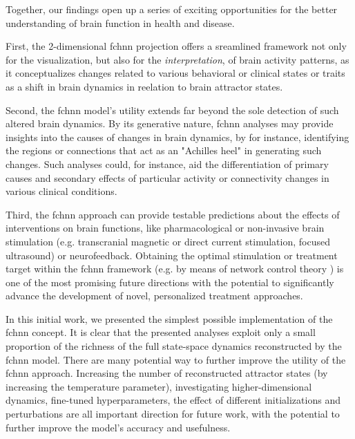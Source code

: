 \documentclass{article}
\begin{document}
Together, our findings open up a series of exciting opportunities for the better understanding of brain function in health and disease.

First, the 2-dimensional \acrshort{fchnn} projection offers a sreamlined framework not only for the visualization, but also for the \textit{interpretation}, of brain activity patterns, as it conceptualizes changes related to various behavioral or clinical states or traits as a shift in brain dynamics in reelation to brain attractor states.

Second, the \acrshort{fchnn} model's utility extends far beyond the sole detection of such altered brain dynamics. By its generative nature, \acrshort{fchnn} analyses may provide insights into the causes of changes in brain dynamics, by for instance, identifying the regions or connections that act as an "Achilles heel" in generating such changes. Such analyses could, for instance, aid the differentiation of primary causes and secondary effects of particular activity or connectivity changes in various clinical conditions.

Third, the \acrshort{fchnn} approach can provide testable predictions about the effects of interventions on brain functions, like pharmacological or non-invasive brain stimulation (e.g. transcranial magnetic or direct current stimulation, focused ultrasound) or neurofeedback. Obtaining the optimal stimulation or treatment target within the \acrshort{fchnn} framework (e.g. by means of network control theory \citep{liu2011controllability}) is one of the most promising future directions with the potential to significantly advance the development of novel, personalized treatment approaches.

In this initial work, we presented the simplest possible implementation of the \acrshort{fchnn} concept. It is clear that the presented analyses exploit only a small proportion of the richness of the full state-space dynamics reconstructed by the \acrshort{fchnn} model.
There are many potential way to further improve the utility of the \acrshort{fchnn} approach. Increasing the number of reconstructed attractor states (by increasing the temperature parameter), investigating higher-dimensional dynamics, fine-tuned hyperparameters, the effect of
different initializations and perturbations are all important direction for future work, with the potential to further improve the model's accuracy and usefulness.
\end{document}
